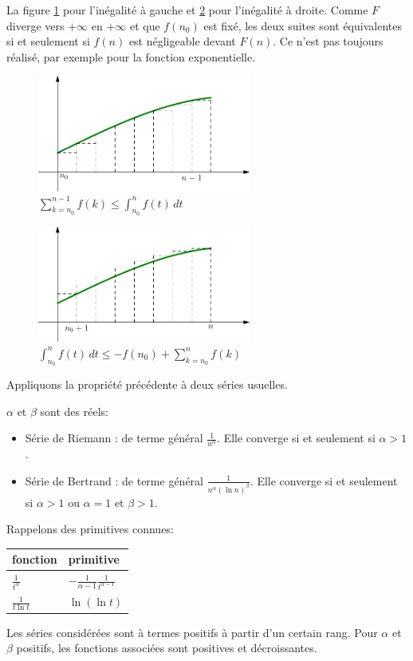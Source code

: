 La figure \ref{fig:C9650_3} pour l'inégalité à gauche et \ref{fig:C9650_4} pour l'inégalité à droite. Comme $F$ diverge vers $+\infty$ en $+\infty$ et que $f(n_0)$ est fixé, les deux suites sont équivalentes si et seulement si $f(n)$ est négligeable devant $F(n)$.\newline
Ce n'est pas toujours réalisé, par exemple pour la fonction exponentielle.
\begin{figure}[ht]
    \centering
    \includegraphics[width=7cm]{./C9650_3.pdf}
    \caption{$\sum_{k=n_0}^{n-1}f(k) \leq \int_{n_0}^nf(t)\,dt$}
    \label{fig:C9650_3}
\end{figure}
\begin{figure}[ht]
    \centering
    \includegraphics[width=7cm]{./C9650_4.pdf}
    \caption{$\int_{n_0}^nf(t)\,dt \leq -f(n_0)+\sum_{k=n_0}^{n}f(k)$}
    \label{fig:C9650_4}
\end{figure}

Appliquons la propriété précédente à deux séries usuelles.
\begin{prop}
$\alpha$ et $\beta$ sont des réels:
\begin{itemize}
  \item Série de Riemann : de terme général $\frac{1}{n^\alpha}$. Elle converge si et seulement si $\alpha >1$.
  \item Série de Bertrand : de terme général $\frac{1}{n^\alpha(\ln n)^\beta}$. Elle converge si et seulement si $\alpha >1$ ou $\alpha = 1$ et $\beta>1$.
\end{itemize}  
\end{prop}
\begin{demo}
  Rappelons des primitives connues:
\begin{center}
\renewcommand{\arraystretch}{1.6}
\begin{tabular}{|l|l|} \hline
fonction & primitive \\ \hline
$\frac{1}{t^\alpha}$ & $-\frac{1}{\alpha -1}\frac{1}{t^{\alpha -1}}$ \\ \hline
$\frac{1}{t\ln t}$ & $\ln(\ln t)$ \\\hline
\end{tabular}
\end{center}
Les séries considérées sont à termes positifs à partir d'un certain rang. Pour $\alpha$ et $\beta$ positifs, les fonctions associées sont positives et décroissantes.
\end{demo}


